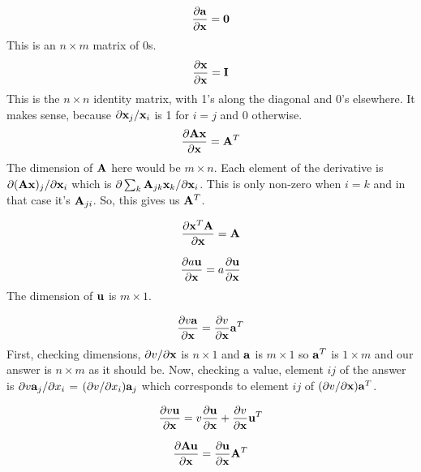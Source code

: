 \begin{equation}\frac{\partial {\bf a}}{\partial {\bf x}} = {\bf 0}
  \label{eq:const}
\end{equation}
  This is an $n \times m$ matrix of 0s.
\begin{equation}\frac{\partial {\bf x}}{\partial {\bf x}} = {\bf I}\end{equation}
  This is the $n \times n$ identity matrix, with 1's along the
  diagonal and 0's elsewhere.  It makes sense, because $\partial {\bf x}_j /
  {\bf x}_i$ is 1 for $i = j$ and 0 otherwise.
  \begin{equation}\frac{\partial {\bf A} {\bf x}}{\partial {\bf x}} = {\bf A}^T
      \label{eq:Ax}
\end{equation}
  The dimension of ${\bf A}$ here would be $m \times n$.  Each element of
  the derivative is $\partial ({\bf A} {\bf x})_j / \partial {\bf x}_i$ which is
  $\partial \sum_k {\bf A}_{jk}{\bf x}_k / \partial {\bf x}_i$.  This is only non-zero
  when $i = k$ and in that case it's ${\bf A}_{ji}$.  So, this gives us ${\bf A}^T$. 

  \begin{equation}
    \frac{\partial {\bf x}^T {\bf A}}{\partial {\bf x}} = {\bf A}
    \label{eq:xTA}
  \end{equation}

\begin{equation}\frac{\partial a {\bf u}}{\partial {\bf x}} = a \frac{\partial {\bf u}}{ \partial {\bf x}}\end{equation}
  The dimension of ${\bf u}$ is $m \times 1$.
  
\begin{equation}\frac{\partial v {\bf a}}{\partial {\bf x}} = \frac{\partial
      v}{\partial {\bf x}}{\bf a}^T\end{equation}
  First, checking dimensions, $\partial v/\partial {\bf x}$ is $n \times
  1$ and ${\bf a}$ is $m \times 1$ so ${\bf a}^T$ is $1 \times m$ and our
  answer is $n \times m$ as it should be.  Now, checking a value,
  element $ij$ of the answer is $\partial v {\bf a}_j / \partial x_i$ =
  $(\partial v / \partial x_i) {\bf a}_j$ which corresponds to element
  $ij$ of $(\partial v / \partial {\bf x}){\bf a}^T$.

\begin{equation}\frac{\partial v {\bf u}}{\partial {\bf x}} = v\frac{\partial
      {\bf u}}{\partial {\bf x}} + \frac{\partial v}{\partial {\bf x}} {\bf u}^T\end{equation}

\begin{equation}\frac{\partial {\bf A} {\bf u}}{\partial {\bf x}} = \frac{\partial
      {\bf u}}{\partial {\bf x}}{\bf A}^T\end{equation}

